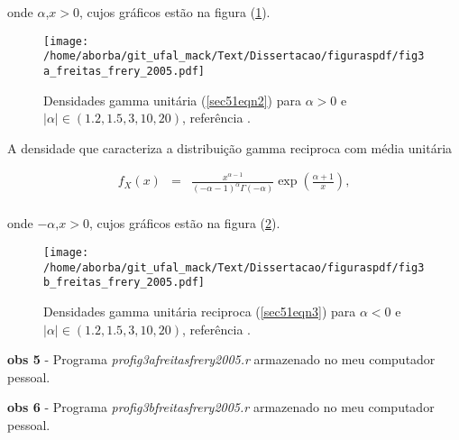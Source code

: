 \documentclass[10pt,a4paper]{article}
\begin{document}
onde $\alpha$,$x>0$, cujos gráficos estão na figura (\ref{sec51fig4}).

\begin{figure}[!htb]
\centering
\texttt{[image: /home/aborba/git\_ufal\_mack/Text/Dissertacao/figuraspdf/fig3a\_freitas\_frery\_2005.pdf]}
	\caption{Densidades  gamma unitária (\ref{sec51eqn2}) para $\alpha > 0$ e $|\alpha|\in(1.2,1.5,3,10,20)$, referência \cite{freitas_frery_2005} .}
\label{sec51fig4}
\end{figure}


A densidade que caracteriza a distribuição gamma reciproca com média unitária

\begin{equation}\label{sec51eqn3}
\begin{array}{ccc}
	f_{X}(x)&=&\frac{x^{\alpha-1}}{(-\alpha-1)^{\alpha}\Gamma(-\alpha)}\exp\left(\frac{\alpha+1}{x}\right), \\
\end{array}
\end{equation}

onde $-\alpha$,$x>0$, cujos gráficos estão na figura (\ref{sec51fig5}).

\begin{figure}[!htb]
\centering
\texttt{[image: /home/aborba/git\_ufal\_mack/Text/Dissertacao/figuraspdf/fig3b\_freitas\_frery\_2005.pdf]}
	\caption{Densidades gamma unitária reciproca (\ref{sec51eqn3}) para $\alpha < 0$ e $|\alpha|\in(1.2,1.5,3,10,20)$, referência \cite{freitas_frery_2005} .}
\label{sec51fig5}
\end{figure}

{\bf obs 5} - Programa {\it profig3afreitasfrery2005.r} armazenado no meu computador pessoal.

{\bf obs 6} - Programa {\it profig3bfreitasfrery2005.r} armazenado no meu computador pessoal.

 
\end{document}
